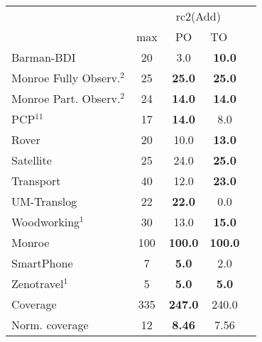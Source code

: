 \documentclass[letterpaper]{article} %
\begin{document}
\begin{table*}[h]
	\centering
	\scalebox{1} {
\begin{tabular}{lccccl} 
	\toprule 
	&& \multicolumn{2}{c}{rc2(Add)} \\
	\cmidrule(lr){3-4}  
	& max &PO & TO \\ 
	\midrule 
	Barman-BDI & 20 & 3.0 &\multicolumn{2}{c}{ \textbf{10.0}  } \\ 
	Monroe Fully Observ.$^{2}$ & 25 & \textbf{25.0} &\multicolumn{2}{c}{ \textbf{25.0}  } \\ 
	Monroe Part. Observ.$^{2}$ & 24 & \textbf{14.0} &\multicolumn{2}{c}{ \textbf{14.0}  } \\ 
	PCP$^{11}$ & 17 & \textbf{14.0} &\multicolumn{2}{c}{ 8.0  } \\ 
	Rover & 20 & 10.0 &\multicolumn{2}{c}{ \textbf{13.0}  } \\ 
	Satellite & 25 & 24.0 &\multicolumn{2}{c}{ \textbf{25.0}  } \\ 
	Transport & 40 & 12.0 &\multicolumn{2}{c}{ \textbf{23.0}  } \\ 
	UM-Translog & 22 & \textbf{22.0} &\multicolumn{2}{c}{ 0.0  } \\ 
	Woodworking$^{1}$ & 30 & 13.0 &\multicolumn{2}{c}{ \textbf{15.0}  } \\ 
	\midrule 
	Monroe & 100 & \textbf{100.0} &\multicolumn{2}{c}{ \textbf{100.0}  } \\ 
	SmartPhone & 7 & \textbf{5.0} &\multicolumn{2}{c}{ 2.0  } \\ 
	Zenotravel$^{1}$ & 5 & \textbf{5.0} &\multicolumn{2}{c}{ \textbf{5.0}  } \\ 
	\midrule 
	Coverage & 335 & \textbf{247.0} &\multicolumn{2}{c}{ 240.0  } \\ 
	Norm. coverage & 12 & \textbf{8.46} &\multicolumn{2}{c}{ 7.56  } \\  
	\bottomrule 
\end{tabular} 
	
	}
\end{table*}

\end{document}
